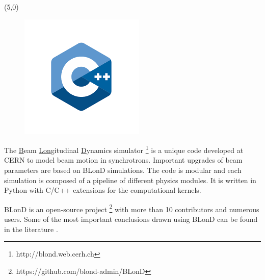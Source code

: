 \begin{frame}
\begin{textblock}{2}
\begin{figure}
		\end{figure}
	\end{textblock}
	\begin{textblock}{2}(5,0)
	\begin{figure}
		\includegraphics[width=\textwidth]{figures/cpp-logo}
	\end{figure}
	\end{textblock}
	\vspace{1.5cm}
	\begin{block}{}
		The \underline{B}eam \underline{Lon}gitudinal \underline{D}ynamics simulator \footnote{http://blond.web.cerh.ch}  is a unique code developed at CERN to model beam motion in synchrotrons. Important upgrades of beam parameters are based on BLonD simulations. The code is modular and each simulation is composed of a pipeline of different physics modules. It is written in Python with C/C++ extensions for the computational kernels.
		
		BLonD is an open-source project \footnote{https://github.com/blond-admin/BLonD} with more than 10 contributors and numerous users. Some of the most important conclusions drawn using BLonD can be found in the literature   .
	\end{block}
\end{frame}


